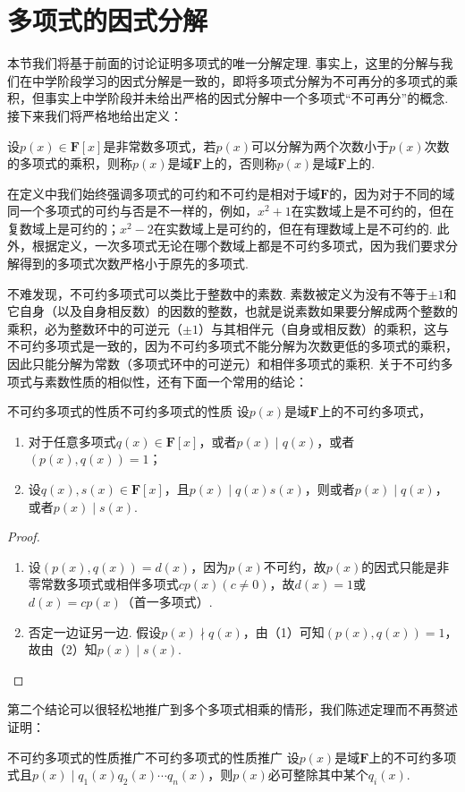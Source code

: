 \section{多项式的因式分解}
本节我们将基于前面的讨论证明多项式的唯一分解定理. 事实上，这里的分解与我们在中学阶段学习的因式分解是一致的，即将多项式分解为不可再分的多项式的乘积，但事实上中学阶段并未给出严格的因式分解中一个多项式``不可再分''的概念. 接下来我们将严格地给出定义：
\begin{definition}{}{}
    设$p(x)\in\mathbf{F}[x]$是非常数多项式，若$p(x)$可以分解为两个次数小于$p(x)$次数的多项式的乘积，则称$p(x)$是域$\mathbf{F}$上的，否则称$p(x)$是域$\mathbf{F}$上的.
\end{definition}

在定义中我们始终强调多项式的可约和不可约是相对于域$\mathbf{F}$的，因为对于不同的域同一个多项式的可约与否是不一样的，例如，$x^2+1$在实数域上是不可约的，但在复数域上是可约的；$x^2-2$在实数域上是可约的，但在有理数域上是不可约的. 此外，根据定义，一次多项式无论在哪个数域上都是不可约多项式，因为我们要求分解得到的多项式次数严格小于原先的多项式.

不难发现，不可约多项式可以类比于整数中的素数. 素数被定义为没有不等于$\pm 1$和它自身（以及自身相反数）的因数的整数，也就是说素数如果要分解成两个整数的乘积，必为整数环中的可逆元（$\pm 1$）与其相伴元（自身或相反数）的乘积，这与不可约多项式是一致的，因为不可约多项式不能分解为次数更低的多项式的乘积，因此只能分解为常数（多项式环中的可逆元）和相伴多项式的乘积. 关于不可约多项式与素数性质的相似性，还有下面一个常用的结论：
\begin{theorem}{不可约多项式的性质}{不可约多项式的性质}
    设$p(x)$是域$\mathbf{F}$上的不可约多项式，
    \begin{enumerate}
        \item 对于任意多项式$q(x)\in\mathbf{F}[x]$，或者$p(x)\mid q(x)$，或者$(p(x),q(x))=1$；
        \item 设$q(x),s(x)\in\mathbf{F}[x]$，且$p(x)\mid q(x)s(x)$，则或者$p(x)\mid q(x)$，或者$p(x)\mid s(x)$.
    \end{enumerate}
\end{theorem}
\begin{proof}
    \begin{enumerate}
        \item 设$(p(x),q(x))=d(x)$，因为$p(x)$不可约，故$p(x)$的因式只能是非零常数多项式或相伴多项式$cp(x)(c\neq 0)$，故$d(x)=1$或$d(x)=cp(x)$（首一多项式）.
        \item 否定一边证另一边. 假设$p(x)\nmid q(x)$，由（1）可知$(p(x),q(x))=1$，故由（2）知$p(x)\mid s(x)$.
    \end{enumerate}
\end{proof}
第二个结论可以很轻松地推广到多个多项式相乘的情形，我们陈述定理而不再赘述证明：
\begin{corollary}{不可约多项式的性质推广}{不可约多项式的性质推广}
    设$p(x)$是域$\mathbf{F}$上的不可约多项式且$p(x)\mid q_1(x)q_2(x)\cdots q_n(x)$，则$p(x)$必可整除其中某个$q_i(x)$.
\end{corollary}

